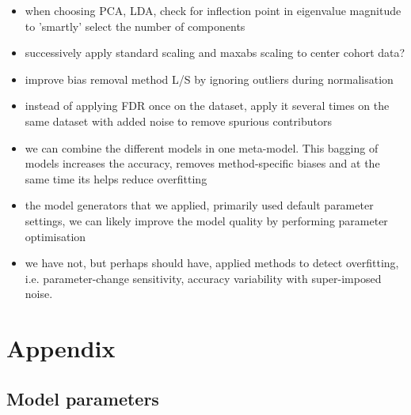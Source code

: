 \documentclass[a4paper,10pt]{article}
\begin{document}
\begin{itemize}
\item when choosing PCA, LDA, check for inflection point in eigenvalue magnitude to 'smartly' select the number of components
\item successively apply standard scaling and maxabs scaling to center cohort data?
\item improve bias removal method L/S by ignoring outliers during normalisation
\item instead of applying FDR once on the dataset, apply it several times on the same dataset with added noise to remove spurious contributors
\item we can combine the different models in one meta-model. This bagging of models increases the accuracy, removes method-specific biases and at the same time its helps reduce overfitting
\item the model generators that we applied, primarily used default parameter settings, we can likely improve the model quality by performing parameter optimisation
\item we have not, but perhaps should have, applied methods to detect overfitting, i.e. parameter-change sensitivity, accuracy variability with super-imposed noise.
\end{itemize}

\section*{Appendix}
\subsection*{Model parameters}
\end{document}
